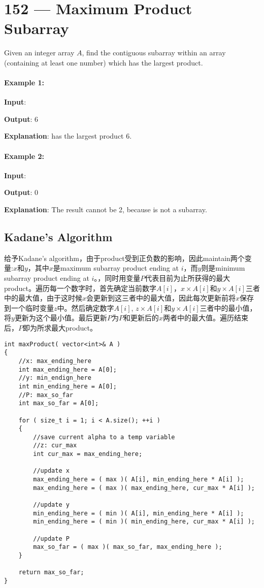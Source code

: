 \section{152 --- Maximum Product Subarray}
Given an integer array $A$, find the contiguous subarray within an array (containing at least one number) which has the largest product.
\paragraph{Example 1:}
\begin{flushleft}
\textbf{Input}: \fcj{[2,3,-2,4]}

\textbf{Output}: 6

\textbf{Explanation}: \fcj{[2,3]} has the largest product 6.
\end{flushleft}

\paragraph{Example 2:}
\begin{flushleft}
\textbf{Input}: \fcj{[-2,0,-1]}

\textbf{Output}: 0

\textbf{Explanation}: The result cannot be 2, because \fcj{[-2,-1]} is not a subarray.
\end{flushleft}
\subsection{Kadane's Algorithm}
给予Kadane's algorithm，由于product受到正负数的影响，因此maintain两个变量:$x$和$y$，其中$x$是maximum subarray product ending at $i$，而$y$则是minimum subarray product ending at $i$。，同时用变量$P$代表目前为止所获得的最大product。遍历每一个数字时，首先确定当前数字$A[i]$，$x\times A[i]$和$y\times A[i]$三者中的最大值，由于这时候$x$会更新到这三者中的最大值，因此每次更新前将$x$保存到一个临时变量$z$中。然后确定数字$A[i]$, $z\times A[i]$和$y\times A[i]$三者中的最小值，将$y$更新为这个最小值。最后更新$P$为$P$和更新后的$x$两者中的最大值。遍历结束后，$P$即为所求最大product。
\setcounter{lstlisting}{0}
\begin{lstlisting}[style=customc, caption={Modified Kadane's Algorithm}]
int maxProduct( vector<int>& A )
{
	//x: max_ending_here
	int max_ending_here = A[0];
	//y: min_endign_here
	int min_ending_here = A[0];
	//P: max_so_far
	int max_so_far = A[0];

	for ( size_t i = 1; i < A.size(); ++i )
	{
		//save current alpha to a temp variable
		//z: cur_max
		int cur_max = max_ending_here;

		//update x
		max_ending_here = ( max )( A[i], min_ending_here * A[i] );
		max_ending_here = ( max )( max_ending_here, cur_max * A[i] );

		//update y
		min_ending_here = ( min )( A[i], min_ending_here * A[i] );
		min_ending_here = ( min )( min_ending_here, cur_max * A[i] );

		//update P
		max_so_far = ( max )( max_so_far, max_ending_here );
	}

	return max_so_far;
}
\end{lstlisting}